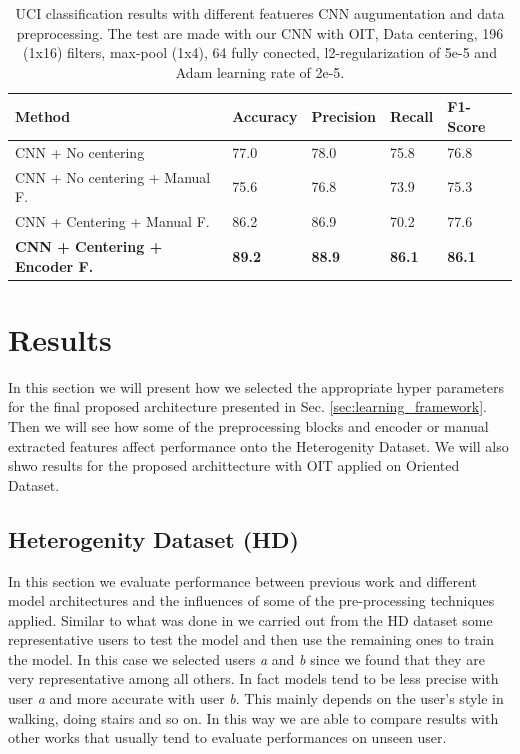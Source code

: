 
\begin{table}[t]
	\begin{center}
		\begin{tabular}{ p{7cm}p{2cm}p{2cm}p{2cm}p{2cm} }
			\hline
			Method & Accuracy & Precision & Recall & F1-Score \\
			\hline
			CNN + No centering & 77.0 & 78.0 & 75.8 & 76.8 \\
			CNN + No centering + Manual F. & 75.6 & 76.8 & 73.9 & 75.3 \\
			CNN + Centering + Manual F. & 86.2 & 86.9 & 70.2 & 77.6 \\
			\textbf{CNN + Centering + Encoder F.} & \textbf{89.2} & \textbf{88.9} &  \textbf{86.1} & \textbf{86.1} \\
			\hline
		\end{tabular}
		\caption{\label{tab:model-performance} UCI classification results with different featueres CNN augumentation and data preprocessing. The test are made with our CNN with OIT, Data centering, 196 (1x16) filters, max-pool (1x4), 64 fully conected, l2-regularization of 5e-5 and Adam learning rate of 2e-5.}
	\end{center}
\end{table}

\section{Results}
\label{sec:results}

In this section we will present how we selected the appropriate hyper
parameters for the final proposed architecture presented in
Sec. \ref{sec:learning_framework}. Then we will see how some of the
preprocessing blocks and encoder or manual extracted features affect
performance onto the Heterogenity Dataset. We will also shwo results
for the proposed archittecture with OIT applied on Oriented Dataset.

\subsection{Heterogenity Dataset (HD)}

In this section we evaluate performance between previous work and
different model architectures and the influences of some of the
pre-processing techniques applied. Similar to what was done in
\cite{ignatov2018real} we carried out from the HD dataset some
representative users to test the model and then use the remaining ones
to train the model. In this case we selected users \textit{a} and
\textit{b} since we found that they are very representative among all
others. In fact models tend to be less precise with user \textit{a}
and more accurate with user \textit{b}. This mainly depends on the
user's style in walking, doing stairs and so on. In this way we are
able to compare results with other works that usually tend to evaluate
performances on unseen user.


